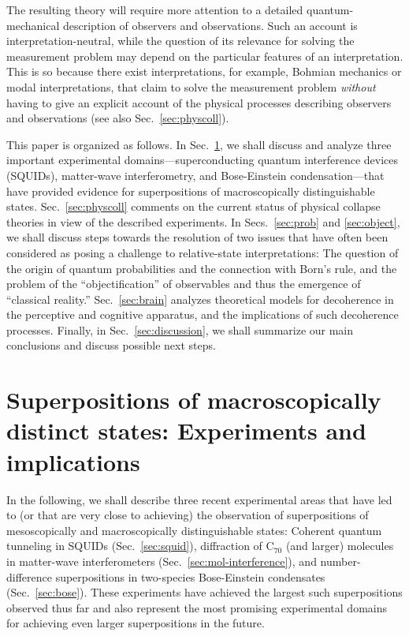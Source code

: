 \documentclass[twocolumn,aps,floatfix,amsmath,amssymb,showpacs,nofootinbib]{revtex4}
\begin{document}
The resulting theory will require more attention to a detailed
quantum-mechanical description of observers and observations. Such an
account is interpretation-neutral, while the question of its relevance
for solving the measurement problem may depend on the particular
features of an interpretation. This is so because there exist
interpretations, for example, Bohmian mechanics or modal
interpretations, that claim to solve the measurement problem
\emph{without} having to give an explicit account of the physical
processes describing observers and observations (see also
Sec.~\ref{sec:physcoll}).

This paper is organized as follows. In Sec.~\ref{sec:experiments}, we
shall discuss and analyze three important experimental
domains---superconducting quantum interference devices (SQUIDs),
matter-wave interferometry, and Bose-Einstein condensation---that have
provided evidence for superpositions of macroscopically
distinguishable states. Sec.~\ref{sec:physcoll} comments on the
current status of physical collapse theories in view of the described
experiments.  In Secs.~\ref{sec:prob} and \ref{sec:object}, we shall
discuss steps towards the resolution of two issues that have often
been considered as posing a challenge to relative-state
interpretations: The question of the origin of quantum probabilities
and the connection with Born's rule, and the problem of the
``objectification'' of observables and thus the emergence of
``classical reality.''  Sec.~\ref{sec:brain} analyzes theoretical
models for decoherence in the perceptive and cognitive apparatus, and
the implications of such decoherence processes.  Finally, in
Sec.~\ref{sec:discussion}, we shall summarize our main conclusions and
discuss possible next steps.


\section{Superpositions of macroscopically
  distinct states: Experiments and
  implications}\label{sec:experiments}

In the following, we shall describe three recent experimental areas
that have led to (or that are very close to achieving) the observation
of superpositions of mesoscopically and macroscopically
distinguishable states: Coherent quantum tunneling in SQUIDs
(Sec.~\ref{sec:squid}), diffraction of C$_{70}$ (and larger) molecules
in matter-wave interferometers (Sec.~\ref{sec:mol-interference}), and
number-difference superpositions in two-species Bose-Einstein
condensates (Sec.~\ref{sec:bose}).  These experiments have achieved
the largest such superpositions observed thus far and also represent
the most promising experimental domains for achieving even larger
superpositions in the future.
\end{document}
